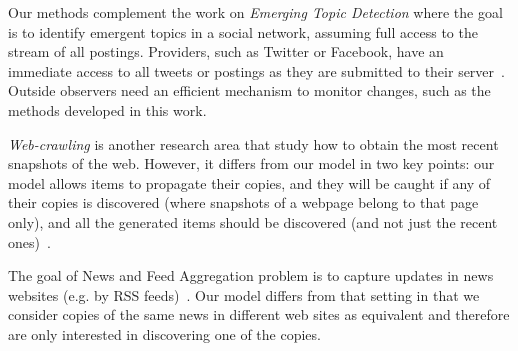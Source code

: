 
Our methods complement the work on \emph{Emerging Topic Detection} where the
goal is to identify emergent topics in a social network, assuming full access to
the stream of all postings. Providers, such as Twitter or Facebook, have an
immediate access to all tweets or postings as they are submitted to their
server~\cite{Cataldi2010,Mathioudakis2010}. Outside observers need an efficient
mechanism to monitor changes, such as the methods developed in this work.

\emph{Web-crawling} is another research area that study how to obtain the
most recent snapshots of the web. However, it differs from our model in two key
points: our model allows items to propagate their copies, and they will be
caught if any of their copies is discovered (where snapshots of a webpage belong
to that page only), and all the generated items should be discovered (and not
just the recent ones)~\cite{dasgupta2007discoverability,wolf2002optimal}.

The goal of {News and Feed Aggregation} problem is to capture updates in news websites (e.g. by RSS feeds)~\cite{survey-oita2011deriving,onlineRef-horincar2014online,adaptive-bright2006adaptive,fast-sia2007efficient}. Our model differs from that setting in that we consider copies of the same news in different web sites as equivalent and therefore are only interested in discovering one of the copies.


